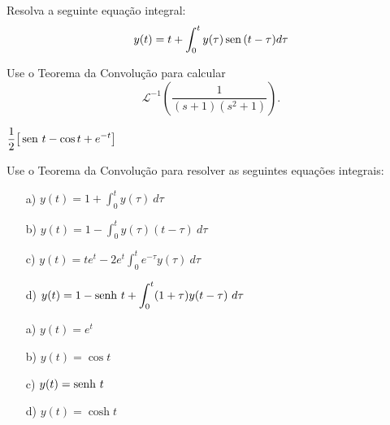 \begin{exer}Resolva a seguinte equação integral:
\begin{equation}
y(t)=t+\int_0^t y(\tau)\operatorname{sen}\,(t-\tau)d\tau
\end{equation}
\end{exer}
\begin{exer}
Use o Teorema da Convolução para calcular \begin{equation}\mathcal{L}^{-1} \left( \frac{1}{(s+1)(s^2+1)} \right).\end{equation}
\end{exer}
\begin{resp}
 $\displaystyle \frac{1}{2} \big[ \operatorname{sen}\, t - \cos t + e^{-t} \big] $
\end{resp}
\begin{exer}
Use o Teorema da Convolução para resolver as seguintes equações integrais:
\begin{itemize}
  \item[a)] $\displaystyle y(t) = 1 + \int_0^t y(\tau) \ d\tau$
  \item[b)] $\displaystyle y(t) = 1 - \int_0^t y(\tau) (t-\tau) \ d\tau$
  \item[c)] $\displaystyle y(t) = te^{t} -2 e^t \int_0^t e^{-\tau} y(\tau) \ d\tau$
  \item[d)] $\displaystyle y(t) = 1 - \operatorname{senh}\, t + \int_0^t (1+ \tau )y(t- \tau) \ d\tau$
\end{itemize}
\end{exer}
\begin{resp}
\begin{itemize}
  \item[a)] $\displaystyle y(t) = e^{t}$
  \item[b)] $\displaystyle y(t) = \cos t$
  \item[c)] $\displaystyle y(t) = \operatorname{senh}\, t$
  \item[d)] $\displaystyle y(t) = \cosh t$
\end{itemize}
\end{resp}